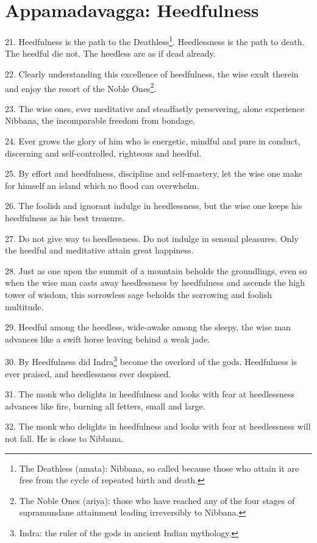 \chapter{Appamadavagga: Heedfulness}

21. Heedfulness is the path to the Deathless\footnote{The Deathless (amata): Nibbana, so called because those who attain it are free from the cycle of repeated birth and death.}. Heedlessness is the path to death. The heedful die not. The heedless are as if dead already.

22. Clearly understanding this excellence of heedfulness, the wise exult therein and enjoy the resort of the Noble Ones\footnote{The Noble Ones (ariya): those who have reached any of the four stages of supramundane attainment leading irreversibly to Nibbana.}.

23. The wise ones, ever meditative and steadfastly persevering, alone experience Nibbana, the incomparable freedom from bondage.

24. Ever grows the glory of him who is energetic, mindful and pure in conduct, discerning and self-controlled, righteous and heedful.

25. By effort and heedfulness, discipline and self-mastery, let the wise one make for himself an island which no flood can overwhelm.

26. The foolish and ignorant indulge in heedlessness, but the wise one keeps his heedfulness as his best treasure.

27. Do not give way to heedlessness. Do not indulge in sensual pleasures. Only the heedful and meditative attain great happiness.

28. Just as one upon the summit of a mountain beholds the groundlings, even so when the wise man casts away heedlessness by heedfulness and ascends the high tower of wisdom, this sorrowless sage beholds the sorrowing and foolish multitude.

29. Heedful among the heedless, wide-awake among the sleepy, the wise man advances like a swift horse leaving behind a weak jade.

30. By Heedfulness did Indra\footnote{Indra: the ruler of the gods in ancient Indian mythology.} become the overlord of the gods. Heedfulness is ever praised, and heedlessness ever despised.

31. The monk who delights in heedfulness and looks with fear at heedlessness advances like fire, burning all fetters, small and large.

32. The monk who delights in heedfulness and looks with fear at heedlessness will not fall. He is close to Nibbana.
